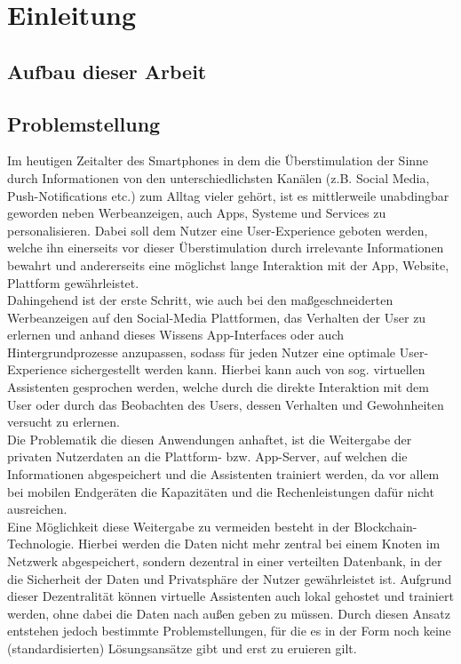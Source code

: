 \chapter{Einleitung}
\label{kap:Kapitel01}
%
      
%
\section{Aufbau dieser Arbeit}
%
 
%
\section{Problemstellung}
Im heutigen Zeitalter des Smartphones in dem die Überstimulation \cite{SMPUse} der Sinne durch Informationen von den unterschiedlichsten Kanälen (z.B. Social Media, Push-Notifications etc.) zum Alltag vieler gehört, ist es mittlerweile unabdingbar geworden neben Werbeanzeigen, auch Apps, Systeme und Services zu personalisieren. Dabei soll dem Nutzer eine User-Experience geboten werden, welche ihn einerseits vor dieser Überstimulation durch irrelevante Informationen bewahrt und andererseits eine möglichst lange Interaktion mit der App, Website, Plattform gewährleistet. \\
Dahingehend ist der erste Schritt, wie auch bei den maßgeschneiderten Werbeanzeigen auf den Social-Media Plattformen, das Verhalten der User zu erlernen und anhand dieses Wissens App-Interfaces oder auch Hintergrundprozesse anzupassen, sodass für jeden Nutzer eine optimale User-Experience sichergestellt werden kann. Hierbei kann auch von sog. virtuellen Assistenten gesprochen werden, welche durch die direkte Interaktion mit dem User oder durch das Beobachten des Users, dessen Verhalten und Gewohnheiten versucht zu erlernen. \\
Die Problematik die diesen Anwendungen anhaftet, ist die Weitergabe der privaten Nutzerdaten an die Plattform- bzw. App-Server, auf welchen die Informationen abgespeichert und die Assistenten trainiert werden, da vor allem bei mobilen Endgeräten die Kapazitäten und die Rechenleistungen dafür nicht ausreichen. \\
Eine Möglichkeit diese Weitergabe zu vermeiden besteht in der Blockchain-Technologie. Hierbei werden die Daten nicht mehr zentral bei einem Knoten im Netzwerk abgespeichert, sondern dezentral in einer verteilten Datenbank, in der die Sicherheit der Daten und Privatsphäre der Nutzer gewährleistet ist. Aufgrund dieser Dezentralität können virtuelle Assistenten auch lokal gehostet und trainiert werden, ohne dabei die Daten nach außen geben zu müssen. Durch diesen Ansatz entstehen jedoch bestimmte Problemstellungen, für die es in der Form noch keine (standardisierten) Lösungsansätze gibt und erst zu eruieren gilt. \\
